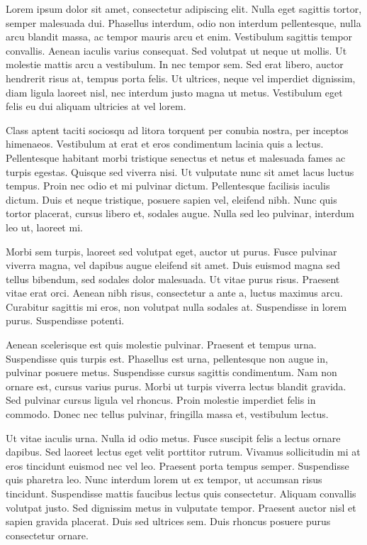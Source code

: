 \documentclass[12pt, a4paper]{article}
\begin{document}
\selectfont
Lorem ipsum dolor sit amet, consectetur adipiscing elit. Nulla eget sagittis tortor, semper malesuada dui. Phasellus interdum, odio non interdum pellentesque, nulla arcu blandit massa, ac tempor mauris arcu et enim. Vestibulum sagittis tempor convallis. Aenean iaculis varius consequat. Sed volutpat ut neque ut mollis. Ut molestie mattis arcu a vestibulum. In nec tempor sem. Sed erat libero, auctor hendrerit risus at, tempus porta felis. Ut ultrices, neque vel imperdiet dignissim, diam ligula laoreet nisl, nec interdum justo magna ut metus. Vestibulum eget felis eu dui aliquam ultricies at vel lorem.

Class aptent taciti sociosqu ad litora torquent per conubia nostra, per inceptos himenaeos. Vestibulum at erat et eros condimentum lacinia quis a lectus. Pellentesque habitant morbi tristique senectus et netus et malesuada fames ac turpis egestas. Quisque sed viverra nisi. Ut vulputate nunc sit amet lacus luctus tempus. Proin nec odio et mi pulvinar dictum. Pellentesque facilisis iaculis dictum. Duis et neque tristique, posuere sapien vel, eleifend nibh. Nunc quis tortor placerat, cursus libero et, sodales augue. Nulla sed leo pulvinar, interdum leo ut, laoreet mi.

Morbi sem turpis, laoreet sed volutpat eget, auctor ut purus. Fusce pulvinar viverra magna, vel dapibus augue eleifend sit amet. Duis euismod magna sed tellus bibendum, sed sodales dolor malesuada. Ut vitae purus risus. Praesent vitae erat orci. Aenean nibh risus, consectetur a ante a, luctus maximus arcu. Curabitur sagittis mi eros, non volutpat nulla sodales at. Suspendisse in lorem purus. Suspendisse potenti.

Aenean scelerisque est quis molestie pulvinar. Praesent et tempus urna. Suspendisse quis turpis est. Phasellus est urna, pellentesque non augue in, pulvinar posuere metus. Suspendisse cursus sagittis condimentum. Nam non ornare est, cursus varius purus. Morbi ut turpis viverra lectus blandit gravida. Sed pulvinar cursus ligula vel rhoncus. Proin molestie imperdiet felis in commodo. Donec nec tellus pulvinar, fringilla massa et, vestibulum lectus.

Ut vitae iaculis urna. Nulla id odio metus. Fusce suscipit felis a lectus ornare dapibus. Sed laoreet lectus eget velit porttitor rutrum. Vivamus sollicitudin mi at eros tincidunt euismod nec vel leo. Praesent porta tempus semper. Suspendisse quis pharetra leo. Nunc interdum lorem ut ex tempor, ut accumsan risus tincidunt. Suspendisse mattis faucibus lectus quis consectetur. Aliquam convallis volutpat justo. Sed dignissim metus in vulputate tempor. Praesent auctor nisl et sapien gravida placerat. Duis sed ultrices sem. Duis rhoncus posuere purus consectetur ornare.
\end{document}
